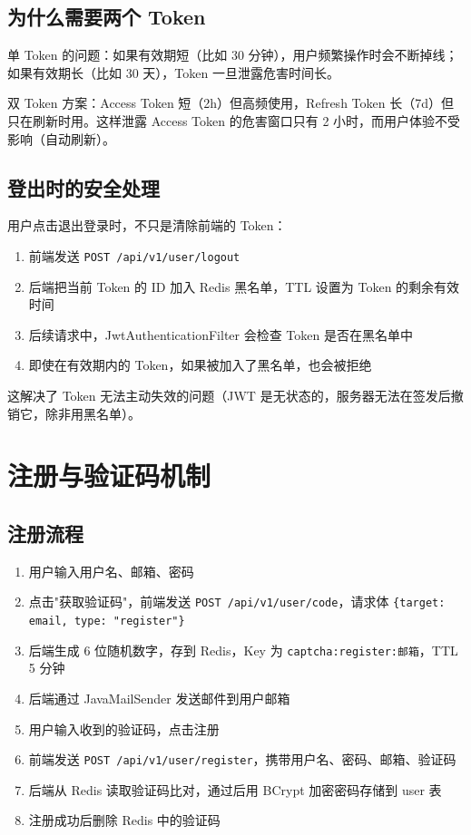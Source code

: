 \documentclass[12pt,a4paper]{ctexart}
\begin{document}
\subsection{为什么需要两个 Token}

单 Token 的问题：如果有效期短（比如 30 分钟），用户频繁操作时会不断掉线；如果有效期长（比如 30 天），Token 一旦泄露危害时间长。

双 Token 方案：Access Token 短（2h）但高频使用，Refresh Token 长（7d）但只在刷新时用。这样泄露 Access Token 的危害窗口只有 2 小时，而用户体验不受影响（自动刷新）。

\subsection{登出时的安全处理}

用户点击退出登录时，不只是清除前端的 Token：
\begin{enumerate}
  \item 前端发送 \texttt{POST /api/v1/user/logout}
  \item 后端把当前 Token 的 ID 加入 Redis 黑名单，TTL 设置为 Token 的剩余有效时间
  \item 后续请求中，JwtAuthenticationFilter 会检查 Token 是否在黑名单中
  \item 即使在有效期内的 Token，如果被加入了黑名单，也会被拒绝
\end{enumerate}

这解决了 Token 无法主动失效的问题（JWT 是无状态的，服务器无法在签发后撤销它，除非用黑名单）。

\section{注册与验证码机制}

\subsection{注册流程}

\begin{enumerate}
  \item 用户输入用户名、邮箱、密码
  \item 点击"获取验证码"，前端发送 \texttt{POST /api/v1/user/code}，请求体 \texttt{\{target: email, type: "register"\}}
  \item 后端生成 6 位随机数字，存到 Redis，Key 为 \texttt{captcha:register:邮箱}，TTL 5 分钟
  \item 后端通过 JavaMailSender 发送邮件到用户邮箱
  \item 用户输入收到的验证码，点击注册
  \item 前端发送 \texttt{POST /api/v1/user/register}，携带用户名、密码、邮箱、验证码
  \item 后端从 Redis 读取验证码比对，通过后用 BCrypt 加密密码存储到 user 表
  \item 注册成功后删除 Redis 中的验证码
\end{enumerate}
\end{document}
